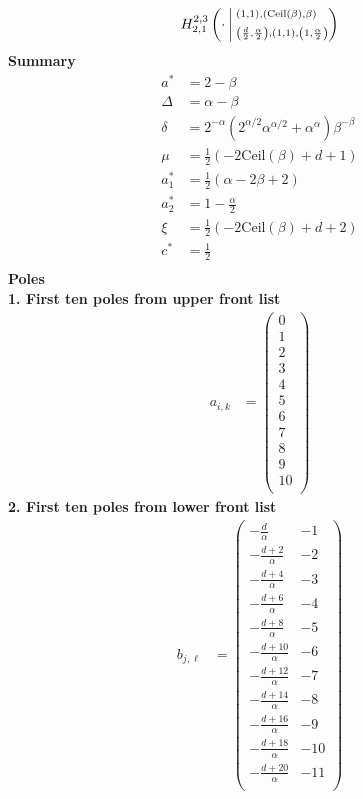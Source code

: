 \documentclass{article}
\newcommand{\FoxH}[5]{H_{#2}^{#1}\left(#3\:\middle\vert\: \begin{subarray}{l}#4\\[0.4em] #5\end{subarray}\right)}
\begin{document}
\begin{align*}
\FoxH{2,3}{2,1}{\cdot}{\left(1, 1\right), \left(\text{Ceil}(\beta ), \beta\right)}{\left(\frac{d}{2}, \frac{\alpha }{2}\right), \left(1, 1\right), \left(1, \frac{\alpha }{2}\right)}
\end{align*}
\noindent\textbf{Summary}
\begin{align*}
a^* &= 2-\beta \\
\Delta &= \alpha -\beta \\
\delta &= 2^{-\alpha } \left(2^{\alpha /2} \alpha ^{\alpha /2}+\alpha ^{\alpha }\right) \beta ^{-\beta } \\
\mu &= \frac{1}{2} (-2 \text{Ceil}(\beta )+d+1) \\
a_1^* &= \frac{1}{2} (\alpha -2 \beta +2) \\
a_2^* &= 1-\frac{\alpha }{2} \\
\xi &= \frac{1}{2} (-2 \text{Ceil}(\beta )+d+2) \\
c^* &= \frac{1}{2} \\
\end{align*}
\noindent\textbf{Poles}\\
\noindent\textbf{1. First ten poles from upper front list}
\begin{align*}
a_{i,k} &= \left(
\begin{array}{c}
 0 \\
 1 \\
 2 \\
 3 \\
 4 \\
 5 \\
 6 \\
 7 \\
 8 \\
 9 \\
 10 \\
\end{array}
\right)
\end{align*}
\noindent\textbf{2. First ten poles from lower front list}
\begin{align*}
b_{j,\ell} &= \left(
\begin{array}{cc}
 -\frac{d}{\alpha } & -1 \\
 -\frac{d+2}{\alpha } & -2 \\
 -\frac{d+4}{\alpha } & -3 \\
 -\frac{d+6}{\alpha } & -4 \\
 -\frac{d+8}{\alpha } & -5 \\
 -\frac{d+10}{\alpha } & -6 \\
 -\frac{d+12}{\alpha } & -7 \\
 -\frac{d+14}{\alpha } & -8 \\
 -\frac{d+16}{\alpha } & -9 \\
 -\frac{d+18}{\alpha } & -10 \\
 -\frac{d+20}{\alpha } & -11 \\
\end{array}
\right)
\end{align*}
\end{document}
